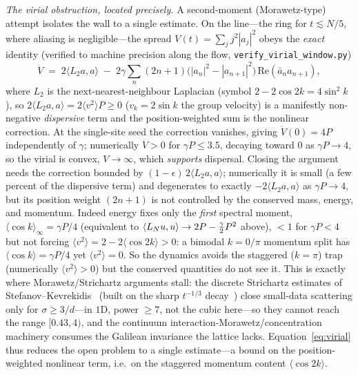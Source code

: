 \emph{The virial obstruction, located precisely.} A second-moment (Morawetz-type) attempt isolates the
wall to a single estimate. On the line---the ring for $t\lesssim N/5$, where aliasing is negligible---the
spread $V(t)=\sum_jj^2|a_j|^2$ obeys the \emph{exact} identity (verified to machine precision along the
flow, \texttt{verify\_virial\_window.py})
\begin{equation}\label{eq:virial}
  \ddot V\;=\;2\langle L_2a,a\rangle\;-\;2\gamma\sum_n(2n+1)\bigl(|a_n|^2-|a_{n+1}|^2\bigr)\,
  \mathrm{Re}(\bar a_na_{n+1}),
\end{equation}
where $L_2$ is the next-nearest-neighbour Laplacian (symbol $2-2\cos2k=4\sin^2k$), so
$2\langle L_2a,a\rangle=2\langle v^2\rangle P\ge0$ ($v_k=2\sin k$ the group velocity) is a manifestly
non-negative \emph{dispersive} term and the position-weighted sum is the nonlinear correction. At the
single-site seed the correction vanishes, giving $\ddot V(0)=4P$ independently of $\gamma$; numerically
$\ddot V>0$ for $\gamma P\le3.5$, decaying toward $0$ as $\gamma P\to4$, so the virial is convex, $V\to\infty$,
which \emph{supports} dispersal. Closing the argument needs the correction bounded by
$(1-\epsilon)\,2\langle L_2a,a\rangle$; numerically it is small (a few percent of the dispersive term) and
degenerates to exactly $-2\langle L_2a,a\rangle$ as $\gamma P\to4$, but its position weight $(2n+1)$ is not
controlled by the conserved mass, energy, and momentum. Indeed energy fixes only the \emph{first} spectral
moment, $\langle\cos k\rangle_\infty=\gamma P/4$ (equivalent to $\langle L_N u,u\rangle\to2P-\tfrac\gamma2P^2$
above), $<1$ for $\gamma P<4$ but not forcing $\langle v^2\rangle=2-2\langle\cos2k\rangle>0$: a bimodal
$k=0/\pi$ momentum split has $\langle\cos k\rangle=\gamma P/4$ yet $\langle v^2\rangle=0$. So the dynamics
avoids the staggered ($k=\pi$) trap (numerically $\langle v^2\rangle>0$) but the conserved quantities do not
see it. This is exactly where Morawetz/Strichartz arguments stall: the discrete Strichartz estimates of
Stefanov--Kevrekidis~\cite{StefanovKevrekidis05} (built on the sharp $t^{-1/3}$ decay~\cite{Landau00,PelinovskyStefanov08,EKT15})
close small-data scattering only for $\sigma\ge3/d$---in $1$D, power $\ge7$, not the cubic
here---so they cannot reach the range $[0.43,4)$, and the continuum interaction-Morawetz/concentration
machinery consumes the Galilean invariance the lattice lacks. Equation~\eqref{eq:virial} thus reduces the
open problem to a single estimate---a bound on the position-weighted nonlinear term, i.e.\ on the staggered
momentum content $\langle\cos2k\rangle$.

